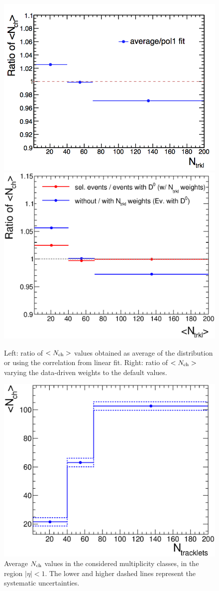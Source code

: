 \begin{figure}[!h]
\centering
 \includegraphics[width=.49\textwidth]{FigCap6/NchSystematics_linFit_WithNtrklsReweight_17f2a.png}
 \includegraphics[width=.49\textwidth]{FigCap6/NchSystematics_NtrklWeights_17f2a.eps}
 \caption{Left: ratio of $<N_{\rm ch}>$ values obtained as average of the distribution or using the correlation from linear fit. Right: ratio of $<N_{\rm ch}>$ varying the data-driven weights to the default values.}
 \label{fig:NchVsCorrHypo}
 \end{figure}


\begin{figure}[h]
\centering
 \includegraphics[width=.55\textwidth]{FigCap6/AverNchAndTotalSystUnc.eps}
 \caption{Average $N_{\rm ch}$ values in the considered multiplicity classes, in the region $|\eta |< 1$. The lower and higher dashed lines represent the systematic uncertainties.}
 \label{fig:Nch}
\end{figure}

